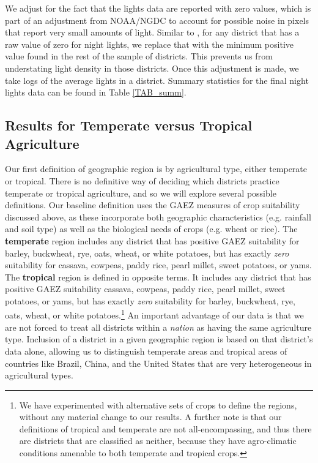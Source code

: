 \documentclass[11pt]{article}
\begin{document}
We adjust for the fact that the lights data are reported with zero values, which is part of an adjustment from NOAA/NGDC to account for possible noise in pixels that report very small amounts of light. Similar to \citet{hssw2016}, for any district that has a raw value of zero for night lights, we replace that with the minimum positive value found in the rest of the sample of districts. This prevents us from understating light density in those districts. Once this adjustment is made, we take logs of the average lights in a district. Summary statistics for the final night lights data can be found in Table \ref{TAB_summ}.

\subsection{Results for Temperate versus Tropical Agriculture}
Our first definition of geographic region is by agricultural type, either temperate or tropical. There is no definitive way of deciding which districts practice temperate or tropical agriculture, and so we will explore several possible definitions. Our baseline definition uses the GAEZ measures of crop suitability discussed above, as these incorporate both geographic characteristics (e.g. rainfall and soil type) as well as the biological needs of crops (e.g. wheat or rice). The \textbf{temperate} region includes any district that has positive GAEZ suitability for barley, buckwheat, rye, oats, wheat, or white potatoes, but has exactly \textit{zero} suitability for cassava, cowpeas, paddy rice, pearl millet, sweet potatoes, or yams. The \textbf{tropical} region is defined in opposite terms. It includes any district that has positive GAEZ suitability cassava, cowpeas, paddy rice, pearl millet, sweet potatoes, or yams, but has exactly \textit{zero} suitability for barley, buckwheat, rye, oats, wheat, or white potatoes.\footnote{We have experimented with alternative sets of crops to define the regions, without any material change to our results. A further note is that our definitions of tropical and temperate are not all-encompassing, and thus there are districts that are classified as neither, because they have agro-climatic conditions amenable to both temperate and tropical crops.} An important advantage of our data is that we are not forced to treat all districts within a \textit{nation} as having the same agriculture type. Inclusion of a district in a given geographic region is based on that district's data alone, allowing us to distinguish temperate areas and tropical areas of countries like Brazil, China, and the United States that are very heterogeneous in agricultural types.
\end{document}
